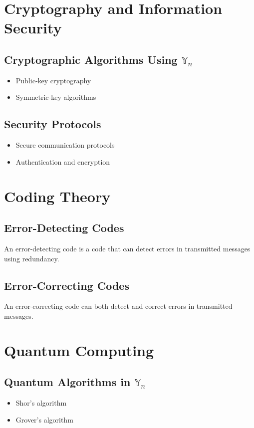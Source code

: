 \documentclass[12pt]{book}
\begin{document}
\section{Cryptography and Information Security}
\subsection{Cryptographic Algorithms Using $\mathbb{Y}_n$}
\begin{itemize}
    \item Public-key cryptography
    \item Symmetric-key algorithms
\end{itemize}
\subsection{Security Protocols}
\begin{itemize}
    \item Secure communication protocols
    \item Authentication and encryption
\end{itemize}

\section{Coding Theory}
\subsection{Error-Detecting Codes}
\begin{definition}
An error-detecting code is a code that can detect errors in transmitted messages using redundancy.
\end{definition}
\subsection{Error-Correcting Codes}
\begin{definition}
An error-correcting code can both detect and correct errors in transmitted messages.
\end{definition}

\section{Quantum Computing}
\subsection{Quantum Algorithms in $\mathbb{Y}_n$}
\begin{itemize}
    \item Shor's algorithm
    \item Grover's algorithm
\end{itemize}
\end{document}
